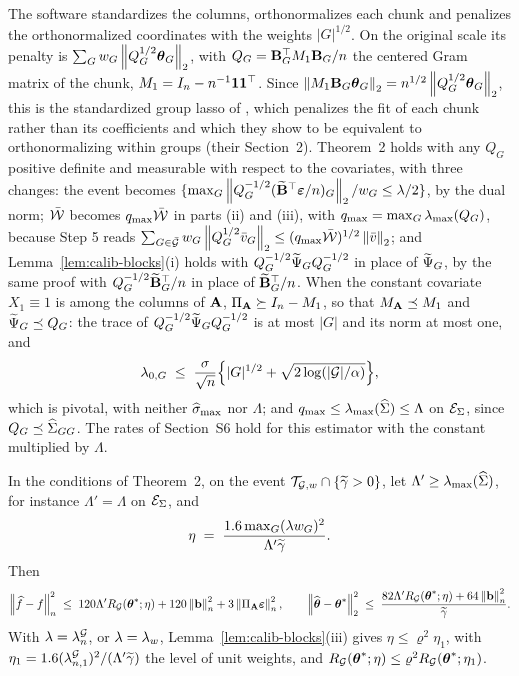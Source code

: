 \begin{remark}
\label{rem:white}
The software standardizes the columns, orthonormalizes each chunk and
penalizes the orthonormalized coordinates with the weights $|G|^{1/2}$. On the
original scale its penalty is $\sum_{G}w_{G}\left\lVert Q_{G}^{1/2}\boldsymbol{\theta}_{G} \right\rVert_{2}$,
with $Q_{G} = \mathbf{B}_{G}^{\top} M_{1}\mathbf{B}_{G}/n$ the centered Gram matrix of the
chunk, $M_{1} = I_{n} - n^{-1}\mathbf{1}\mathbf{1}^{\top}$.
Since
$\left\lVert M_{1}\mathbf{B}_{G}\boldsymbol{\theta}_{G} \right\rVert_{2} = n^{1/2}\left\lVert Q_{G}^{1/2}\boldsymbol{\theta}_{G} \right\rVert_{2}$,
this is the standardized group lasso of
\citet[eq.~1.4]{Simon-Tibshirani-2012}, which penalizes the fit of each
chunk rather than its coefficients and which they show to be equivalent to
orthonormalizing within groups (their Section~2). Theorem~2 holds with any
$Q_{G}$ positive definite and measurable with respect to the covariates, with
three changes: the event becomes
$\{\max_{G}\left\lVert Q_{G}^{-1/2}(\widetilde{\mathbf{B}}^{\top}\boldsymbol{\varepsilon}/n)_{G} \right\rVert_{2}/w_{G} \le \lambda/2\}$, by
the dual norm; $\bar{\mathcal{W}}$ becomes $q_{\max}\bar{\mathcal{W}}$ in parts (ii) and
(iii), with $q_{\max} = \max_{G}\lambda_{\max}(Q_{G})$, because Step 5 reads
$\sum_{G\in\bar{\mathcal{G}}}w_{G}\left\lVert Q_{G}^{1/2}\bar{v}_{G} \right\rVert_{2} \le
(q_{\max}\bar{\mathcal{W}})^{1/2}\left\lVert \bar{v} \right\rVert_{2}$; and Lemma~\ref{lem:calib-blocks}(i)
holds with $Q_{G}^{-1/2}\widetilde{\Psi}_{G}Q_{G}^{-1/2}$ in place of $\widetilde{\Psi}_{G}$, by
the same proof with $Q_{G}^{-1/2}\widetilde{\mathbf{B}}_{G}^{\top}/n$ in place of $\widetilde{\mathbf{B}}_{G}^{\top}/n$.
When the constant covariate $X_{1}\equiv 1$ is among the columns of $\mathbf{A}$,
$\Pi_{\mathbf{A}} \succeq I_{n} - M_{1}$, so that $M_{\mathbf{A}} \preceq M_{1}$ and
$\widetilde{\Psi}_{G} \preceq Q_{G}$: the trace of $Q_{G}^{-1/2}\widetilde{\Psi}_{G}Q_{G}^{-1/2}$
is at most $|G|$ and its norm at most one, and
\[
  \lambda_{0,G} \;\le\; \frac{\sigma}{\sqrt{n}}\Bigl\{|G|^{1/2}
  + \sqrt{2\log(|\mathcal{G}|/\alpha)}\Bigr\},
\]
which is pivotal, with neither $\widehat{\sigma}_{\max}$ nor $\Lambda$; and
$q_{\max} \le \lambda_{\max}(\widehat{\Sigma}) \le \Lambda$ on $\mathcal{E}_{\Sigma}$, since
$Q_{G} \preceq \widehat{\Sigma}_{GG}$. The rates of Section~S6 hold for this estimator
with the constant multiplied by $\Lambda$.
\end{remark}

\begin{corollary}
\label{cor:ideal}
In the conditions of Theorem~2, on the event $\mathcal{T}_{\mathcal{G},w}\cap\{\widetilde{\gamma} > 0\}$, let
$\Lambda' \ge \lambda_{\max}(\widehat{\Sigma})$, for instance $\Lambda' = \Lambda$ on $\mathcal{E}_{\Sigma}$,
and
\[
  \eta \;=\; \frac{1.6\max_{G}(\lambda w_{G})^{2}}{\Lambda'\widetilde{\gamma}}.
\]
Then
\[
  \left\lVert \widehat{f}-f \right\rVert_{n}^{2} \;\le\; 120\Lambda'R_{\mathcal{G}}(\boldsymbol{\theta}^{*};\eta)
  + 120\left\lVert \mathbf{b} \right\rVert_{n}^{2} + 3\left\lVert \Pi_{\mathbf{A}}\boldsymbol{\varepsilon} \right\rVert_{n}^{2},
  \qquad
  \left\lVert \widehat{\boldsymbol{\theta}}-\boldsymbol{\theta}^{*} \right\rVert_{2}^{2} \;\le\;
  \frac{82\Lambda'R_{\mathcal{G}}(\boldsymbol{\theta}^{*};\eta) + 64\left\lVert \mathbf{b} \right\rVert_{n}^{2}}{\widetilde{\gamma}}.
\]
With $\lambda = \lambda^{\mathcal{G}}_{n}$, or $\lambda = \lambda_{w}$, Lemma~\ref{lem:calib-blocks}(iii)
gives $\eta \le \varrho^{2}\eta_{1}$, with
$\eta_{1} = 1.6(\lambda^{\mathcal{G}}_{n,1})^{2}/(\Lambda'\widetilde{\gamma})$ the level of unit weights, and
$R_{\mathcal{G}}(\boldsymbol{\theta}^{*};\eta) \le \varrho^{2}R_{\mathcal{G}}(\boldsymbol{\theta}^{*};\eta_{1})$.
\end{corollary}

